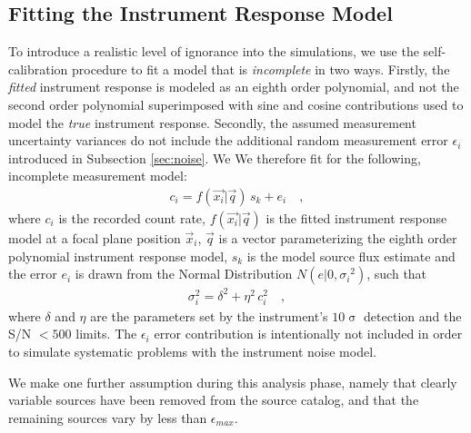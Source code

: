 \documentclass[preprint,pdftex]{aastex}
\begin{document}
\subsection{Fitting the Instrument Response Model}
To introduce a realistic level of ignorance into the simulations, we use the self-calibration procedure to fit a model that is \textit{incomplete} in two ways. Firstly, the \textit{fitted} instrument response is modeled as an eighth order polynomial, and not the second order polynomial superimposed with sine and cosine contributions used to model the \textit{true} instrument response. Secondly, the assumed measurement uncertainty variances do not include the additional random measurement error $\epsilon_{i}$ introduced in Subsection \ref{sec:noise}. We 
We therefore fit for the following, incomplete measurement model:
\begin{eqnarray*}
c_i = f(\vec{x_i} | \vec{q}) \, s_{k} + e_{i} \quad ,
\end{eqnarray*}
where $c_i$ is the recorded count rate, $f(\vec{x_i} | \vec{q})$ is the fitted instrument response model at a focal plane position $\vec{x}_i$, $\vec{q}$ is a vector parameterizing the eighth order polynomial instrument response model, $s_k$ is the model source flux estimate and the error $e_i$ is drawn from the Normal Distribution $N(e|0,{\sigma_i}^2)$, such that
\begin{eqnarray*}
\sigma_{{i}}^{2} = \delta^{2} + \eta^{2}\, c^{2}_i \quad ,
\end{eqnarray*} 
where $\delta$ and $\eta$ are the parameters set by the instrument's $10\upsigma$ detection and the S/N $<500$ limits. The $\epsilon_i$ error contribution is intentionally not included in order to simulate systematic problems with the instrument noise model. 

We make one further assumption during this analysis phase, namely that clearly variable sources have been removed from the source catalog, and that the remaining sources vary by less than $\epsilon_{max}$.
\end{document}
